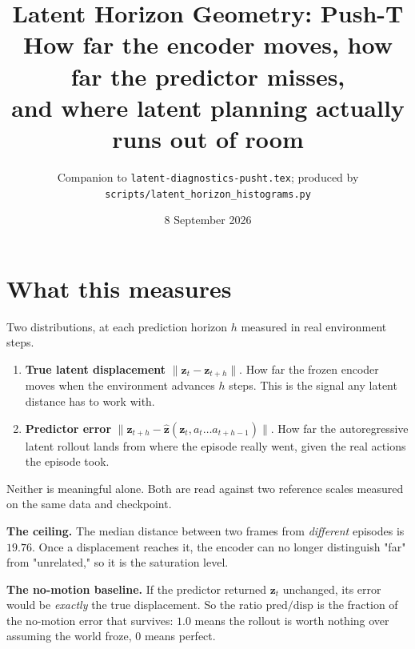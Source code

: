 \documentclass[11pt]{article}
\title{\vspace{-2em}\textbf{Latent Horizon Geometry: Push-T}\\[0.3em]
\large How far the encoder moves, how far the predictor misses,\\
and where latent planning actually runs out of room}
\author{Companion to \texttt{latent-diagnostics-pusht.tex}; produced by
\texttt{scripts/latent\_horizon\_histograms.py}}
\date{8 September 2026}
\newcommand{\zv}{\mathbf{z}}
\begin{document}
\maketitle
\vspace{-1.5em}

\begin{center}
\end{center}

\section{What this measures}

Two distributions, at each prediction horizon $h$ measured in real environment steps.

\begin{enumerate}[leftmargin=1.4em,itemsep=2pt]
\item \textbf{True latent displacement} $\|\zv_t - \zv_{t+h}\|$. How far the frozen encoder
moves when the environment advances $h$ steps. This is the signal any latent distance has to
work with.
\item \textbf{Predictor error} $\|\zv_{t+h} - \widehat{\zv}(\zv_t, a_t \dots a_{t+h-1})\|$.
How far the autoregressive latent rollout lands from where the episode really went, given the
real actions the episode took.
\end{enumerate}

Neither is meaningful alone. Both are read against two reference scales measured on the same
data and checkpoint.

\textbf{The ceiling.} The median distance between two frames from \emph{different} episodes
is $\mathbf{19.76}$. Once a displacement reaches it, the encoder can no longer distinguish
"far" from "unrelated," so it is the saturation level.

\textbf{The no-motion baseline.} If the predictor returned $\zv_t$ unchanged, its error would
be \emph{exactly} the true displacement. So the ratio $\text{pred}/\text{disp}$ is the
fraction of the no-motion error that survives: $1.0$ means the rollout is worth nothing over
assuming the world froze, $0$ means perfect.
\end{document}
